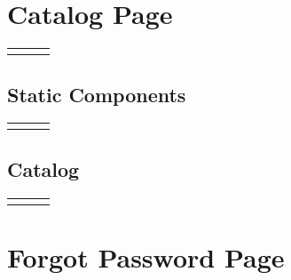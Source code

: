\documentclass[12pt, letterpaper]{article}
\newcommand{\IPO}[3]{
  \begin{center}
    \begin{tabularx}{\linewidth}{XXX}
      \toprule
      \thead{Input} & \thead{Process} & \thead{Output} \\
      \midrule
      \RaggedRight{#1} & \RaggedRight{#2} & \RaggedRight{#3} \\
      \bottomrule
    \end{tabularx}
  \end{center}
}
\newcommand{\n}{\newline}
\begin{document}
\section{Catalog Page}

\IPO{Any one of:\begin{itemize}\item Redirect \item Enter (\ref{enter}) \item ``Parts Inventory'' button (\ref{buttons})\end{itemize}}{Render navigation bar (\ref{navbar})\n Render static components\n Render catalog}{Catalog page}

\subsection{Static Components}

\IPO{}{Render ``Parts Inventory''\n Render ``Only take what you need''}{Static components}

\subsection{Catalog}\label{catalog}

\IPO{\begin{enumerate}\item Page (default: 1)\item Sort Method (default: ID)\item Sort Order (default: ascending)\item Search query (optional)\end{enumerate}}{Query database for parts with inputted search parameters\n~\n Render a ``loading'' placeholder while the database is being queried\n~\n\textbf{IF} no parts found\n$\Rightarrow$Render ``empty'' \n\textbf{ELSE IF} an error occurred\n$\Rightarrow$Render ``error'' \n\textbf{ELSE}\n$\Rightarrow$\textbf{FOR} each part\n$\Rightarrow\Rightarrow$Render details\n$\Rightarrow\Rightarrow$Render ``add to basket'' button (\ref{ATB}, quantity of 1)\n$\Rightarrow\Rightarrow$\textbf{IF} part's stock is 0\n$\Rightarrow\Rightarrow\Rightarrow$Disable button\n$\Rightarrow\Rightarrow$Redirect to the part's page if the part is pressed\n~\n Render dropdown menus to change the search parameters, if any change, repeat~\ref{catalog}}{Catalog}

\section{Forgot Password Page}\label{forgot}
\end{document}
